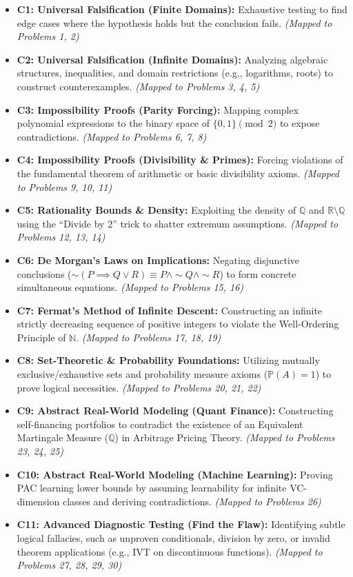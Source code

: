 \documentclass[11pt]{article}
\theoremstyle{definition}
\begin{document}
\begin{itemize}
    \item \textbf{C1: Universal Falsification (Finite Domains):} Exhaustive testing to find edge cases where the hypothesis holds but the conclusion fails. \textit{(Mapped to Problems 1, 2)}
    \item \textbf{C2: Universal Falsification (Infinite Domains):} Analyzing algebraic structures, inequalities, and domain restrictions (e.g., logarithms, roots) to construct counterexamples. \textit{(Mapped to Problems 3, 4, 5)}
    \item \textbf{C3: Impossibility Proofs (Parity Forcing):} Mapping complex polynomial expressions to the binary space of $\{0, 1\} \pmod{2}$ to expose contradictions. \textit{(Mapped to Problems 6, 7, 8)}
    \item \textbf{C4: Impossibility Proofs (Divisibility \& Primes):} Forcing violations of the fundamental theorem of arithmetic or basic divisibility axioms. \textit{(Mapped to Problems 9, 10, 11)}
    \item \textbf{C5: Rationality Bounds \& Density:} Exploiting the density of $\mathbb{Q}$ and $\mathbb{R} \setminus \mathbb{Q}$ using the ``Divide by 2'' trick to shatter extremum assumptions. \textit{(Mapped to Problems 12, 13, 14)}
    \item \textbf{C6: De Morgan's Laws on Implications:} Negating disjunctive conclusions ($\sim(P \implies Q \lor R) \equiv P \land \sim Q \land \sim R$) to form concrete simultaneous equations. \textit{(Mapped to Problems 15, 16)}
    \item \textbf{C7: Fermat's Method of Infinite Descent:} Constructing an infinite strictly decreasing sequence of positive integers to violate the Well-Ordering Principle of $\mathbb{N}$. \textit{(Mapped to Problems 17, 18, 19)}
    \item \textbf{C8: Set-Theoretic \& Probability Foundations:} Utilizing mutually exclusive/exhaustive sets and probability measure axioms ($\mathbb{P}(A)=1$) to prove logical necessities. \textit{(Mapped to Problems 20, 21, 22)}
    \item \textbf{C9: Abstract Real-World Modeling (Quant Finance):} Constructing self-financing portfolios to contradict the existence of an Equivalent Martingale Measure ($\mathbb{Q}$) in Arbitrage Pricing Theory. \textit{(Mapped to Problems 23, 24, 25)}
    \item \textbf{C10: Abstract Real-World Modeling (Machine Learning):} Proving PAC learning lower bounds by assuming learnability for infinite VC-dimension classes and deriving contradictions. \textit{(Mapped to Problems 26)}
    \item \textbf{C11: Advanced Diagnostic Testing (Find the Flaw):} Identifying subtle logical fallacies, such as unproven conditionals, division by zero, or invalid theorem applications (e.g., IVT on discontinuous functions). \textit{(Mapped to Problems 27, 28, 29, 30)}
\end{itemize}
\end{document}
